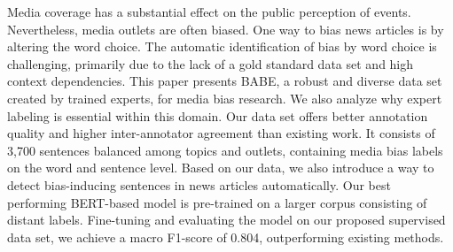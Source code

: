 Media coverage has a substantial effect on the public perception of events. Nevertheless, media outlets are often biased. One way to bias news articles is by altering the word choice. The automatic identification of bias by word choice is challenging, primarily due to the lack of a gold standard data set and high context dependencies. This paper presents BABE, a robust and diverse data set created by trained experts, for media bias research. We also analyze why expert labeling is essential within this domain. Our data set offers better annotation quality and higher inter-annotator agreement than existing work. It consists of 3,700 sentences balanced among topics and outlets, containing media bias labels on the word and sentence level. Based on our data, we also introduce a way to detect bias-inducing sentences in news articles automatically. Our best performing BERT-based model is pre-trained on a larger corpus consisting of distant labels. Fine-tuning and evaluating the model on our proposed supervised data set, we achieve a macro F1-score of 0.804, outperforming existing methods.
